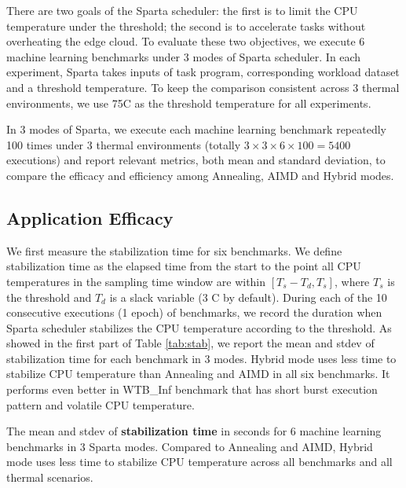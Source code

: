 There are two goals of the Sparta scheduler: the first is to limit the CPU temperature under the threshold; the second is to accelerate tasks without overheating the edge cloud. To evaluate these two objectives, we execute 6 machine learning benchmarks under 3 modes of Sparta scheduler. In each experiment, Sparta takes inputs of task program, corresponding workload dataset and a threshold temperature. To keep the comparison consistent across 3 thermal environments, we use 75\degree C as the threshold temperature for all experiments.

In 3 modes of Sparta, we execute each machine learning benchmark repeatedly 100 times under 3 thermal environments (totally $3 \times 3 \times 6 \times 100 = 5400$ executions) and report relevant metrics, both mean and standard deviation, to compare the efficacy and efficiency among Annealing, AIMD and Hybrid modes.


\subsection{Application Efficacy}

We first measure the stabilization time for six benchmarks. We define stabilization time as the elapsed time from the start to the point all CPU temperatures in the sampling time window are within $[T_s - T_d, T_s]$, where $T_s$ is the threshold and $T_d$ is a slack variable (3 \degree C by default). During each of the 10 consecutive executions (1 epoch) of benchmarks, we record the duration when Sparta scheduler stabilizes the CPU temperature according to the threshold. As showed in the first part of Table \ref{tab:stab}, we report the mean and stdev of stabilization time for each benchmark in 3 modes. Hybrid mode uses less time to stabilize CPU temperature than Annealing and AIMD in all six benchmarks. It performs even better in WTB\_Inf benchmark that has short burst execution pattern and volatile CPU temperature.


\begin{table}[t]
\caption{The mean and stdev of \textbf{stabilization time} in seconds for 6 machine learning benchmarks in 3 Sparta modes. Compared to Annealing and AIMD, Hybrid mode uses less time to stabilize CPU temperature across all benchmarks and all thermal scenarios. }\label{tab:stab}
\vspace{1mm}
\centering
\resizebox{350pt}{!}{}
\newline
\vspace{3mm}
\newline
\resizebox{300pt}{!}{}
\end{table}


